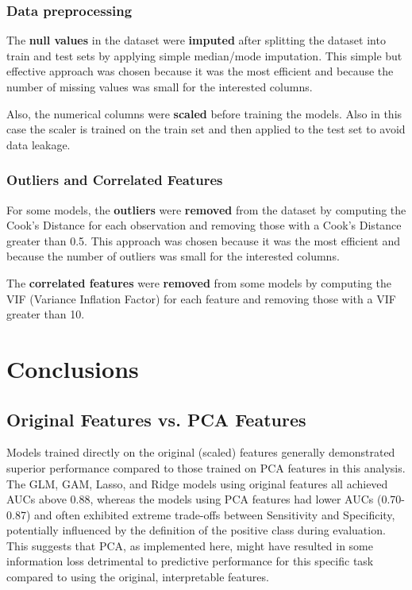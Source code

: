 \subsection{Data preprocessing}
The \textbf{null values} in the dataset were \textbf{imputed} after splitting the dataset into train and test sets by applying simple median/mode imputation. This simple but effective approach was chosen because it was the most efficient and because the number of missing values was small for the interested columns.

Also, the numerical columns were \textbf{scaled} before training the models. Also in this case the scaler is trained on the train set and then applied to the test set to avoid data leakage.

\subsection{Outliers and Correlated Features}
For some models, the \textbf{outliers} were \textbf{removed} from the dataset by computing the Cook's Distance for each observation and removing those with a Cook's Distance greater than 0.5. This approach was chosen because it was the most efficient and because the number of outliers was small for the interested columns.

The \textbf{correlated features} were \textbf{removed} from some models by computing the VIF (Variance Inflation Factor) for each feature and removing those with a VIF greater than 10.

\chapter{Conclusions}
\section{Original Features vs. PCA Features}
Models trained directly on the original (scaled) features generally demonstrated superior performance compared to those trained on PCA features in this analysis. The GLM, GAM, Lasso, and Ridge models using original features all achieved AUCs above 0.88, whereas the models using PCA features had lower AUCs (0.70-0.87) and often exhibited extreme trade-offs between Sensitivity and Specificity, potentially influenced by the definition of the positive class during evaluation. This suggests that PCA, as implemented here, might have resulted in some information loss detrimental to predictive performance for this specific task compared to using the original, interpretable features.

